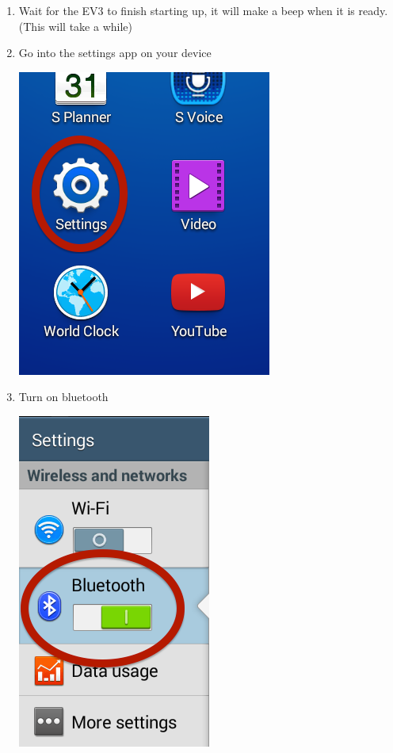 \documentclass[]{article}   	%
\begin{document}
{\begin{enumerate}
	\item Wait for the EV3 to finish starting up, it will make a beep when it is ready. (This will take a while)
	\item Go into the settings app on your device\\
		\begin{center}
			\includegraphics[scale=0.4]{settingapp.png}
		\end{center}			
	\item Turn on bluetooth	\\
		\begin{center}
			\includegraphics[scale=0.45]{btswitch.png}

\end{center}
\end{enumerate}}
\end{document}
